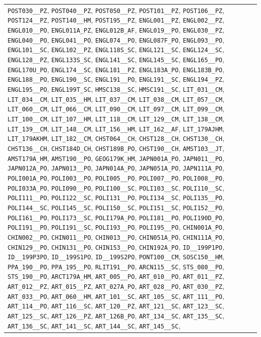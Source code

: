 \begin{longtable}{|p{4.4in}|p{4.4in}|}
\verb|POST030__PZ|, \verb|POST040__PZ|, \verb|POST050__PZ|, \verb|POST101__PZ|, \verb|POST106__PZ|, \verb|POST124__PZ|, \verb|POST140__HM|, \verb|POST195__PZ|, \verb|ENGL001__PZ|, \verb|ENGL002__PZ|, \verb|ENGL010__PO|, \verb|ENGL011A_PZ|, \verb|ENGL012B_AF|, \verb|ENGL019__PO|, \verb|ENGL030__PZ|, \verb|ENGL040__PO|, \verb|ENGL041__PO|, \verb|ENGL074__PO|, \verb|ENGL087F_PO|, \verb|ENGL093__PO|, \verb|ENGL101__SC|, \verb|ENGL102__PZ|, \verb|ENGL118S_SC|, \verb|ENGL121__SC|, \verb|ENGL124__SC|, \verb|ENGL128__PZ|, \verb|ENGL133S_SC|, \verb|ENGL141__SC|, \verb|ENGL145__SC|, \verb|ENGL165__PO|, \verb|ENGL170U_PO|, \verb|ENGL174__SC|, \verb|ENGL181__PZ|, \verb|ENGL183A_PO|, \verb|ENGL183B_PO|, \verb|ENGL188__PO|, \verb|ENGL190__SC|, \verb|ENGL191__PO|, \verb|ENGL191__SC|, \verb|ENGL194__PZ|, \verb|ENGL195__PO|, \verb|ENGL199T_SC|, \verb|HMSC138__SC|, \verb|HMSC191__SC|, \verb|LIT_031__CM|, \verb|LIT_034__CM|, \verb|LIT_035__HM|, \verb|LIT_037__CM|, \verb|LIT_038__CM|, \verb|LIT_057__CM|, \verb|LIT_060__CM|, \verb|LIT_066__CM|, \verb|LIT_090__CM|, \verb|LIT_097__CM|, \verb|LIT_099__CM|, \verb|LIT_100__CM|, \verb|LIT_107__HM|, \verb|LIT_118__CM|, \verb|LIT_129__CM|, \verb|LIT_138__CM|, \verb|LIT_139__CM|, \verb|LIT_148__CM|, \verb|LIT_156__HM|, \verb|LIT_162__AF|, \verb|LIT_179AJHM|, \verb|LIT_179AKHM|, \verb|LIT_182__CM|, \verb|CHST064__CH|, \verb|CHST128__CH|, \verb|CHST130__CH|, \verb|CHST136__CH|, \verb|CHST184D_CH|, \verb|CHST189B_PO|, \verb|CHST190__CH|, \verb|AMST103__JT|, \verb|AMST179A_HM|, \verb|AMST190__PO|, \verb|GEOG179K_HM|, \verb|JAPN001A_PO|, \verb|JAPN011__PO|, \verb|JAPN012A_PO|, \verb|JAPN013__PO|, \verb|JAPN014A_PO|, \verb|JAPN051A_PO|, \verb|JAPN111A_PO|, \verb|POLI001A_PO|, \verb|POLI003__PO|, \verb|POLI005__PO|, \verb|POLI007__PO|, \verb|POLI008__PO|, \verb|POLI033A_PO|, \verb|POLI090__PO|, \verb|POLI100__SC|, \verb|POLI103__SC|, \verb|POLI110__SC|, \verb|POLI111__PO|, \verb|POLI122__SC|, \verb|POLI131__PO|, \verb|POLI134__SC|, \verb|POLI135__PO|, \verb|POLI144__SC|, \verb|POLI145__SC|, \verb|POLI150__SC|, \verb|POLI151__SC|, \verb|POLI152__PO|, \verb|POLI161__PO|, \verb|POLI173__SC|, \verb|POLI179A_PO|, \verb|POLI181__PO|, \verb|POLI190D_PO|, \verb|POLI191__PO|, \verb|POLI191__SC|, \verb|POLI193__PO|, \verb|POLI195__PO|, \verb|CHIN001A_PO|, \verb|CHIN002__PO|, \verb|CHIN011__PO|, \verb|CHIN013__PO|, \verb|CHIN051A_PO|, \verb|CHIN111A_PO|, \verb|CHIN129__PO|, \verb|CHIN131__PO|, \verb|CHIN153__PO|, \verb|CHIN192A_PO|, \verb|ID__199P1PO|, \verb|ID__199P3PO|, \verb|ID__199S1PO|, \verb|ID__199S2PO|, \verb|PONT100__CM|, \verb|SOSC150__HM|, \verb|PPA_190__PO|, \verb|PPA_195__PO|, \verb|RLIT191__PO|, \verb|ARCN115__SC|, \verb|STS_080__PO|, \verb|STS_190__PO|, \verb|ARCT179A_HM|, \verb|ART_005__PO|, \verb|ART_010__PO|, \verb|ART_011__PZ|, \verb|ART_012__PZ|, \verb|ART_015__PZ|, \verb|ART_027A_PO|, \verb|ART_028__PO|, \verb|ART_030__PZ|, \verb|ART_033__PO|, \verb|ART_060__HM|, \verb|ART_101__SC|, \verb|ART_105__SC|, \verb|ART_111__PO|, \verb|ART_114__PO|, \verb|ART_116__SC|, \verb|ART_120__PZ|, \verb|ART_121__SC|, \verb|ART_123__SC|, \verb|ART_125__SC|, \verb|ART_126__PZ|, \verb|ART_126B_PO|, \verb|ART_134__SC|, \verb|ART_135__SC|, \verb|ART_136__SC|, \verb|ART_141__SC|, \verb|ART_144__SC|, \verb|ART_145__SC|, 
\end{longtable}
